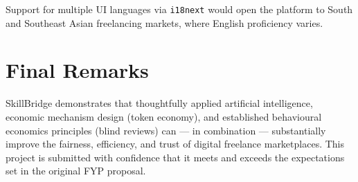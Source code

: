 Support for multiple UI languages via \texttt{i18next} would open the platform to South
and Southeast Asian freelancing markets, where English proficiency varies.

\section{Final Remarks}

\begin{featurebox}
SkillBridge demonstrates that thoughtfully applied artificial intelligence, economic
mechanism design (token economy), and established behavioural economics principles
(blind reviews) can — in combination — substantially improve the fairness, efficiency,
and trust of digital freelance marketplaces. This project is submitted with confidence
that it meets and exceeds the expectations set in the original FYP proposal.
\end{featurebox}

